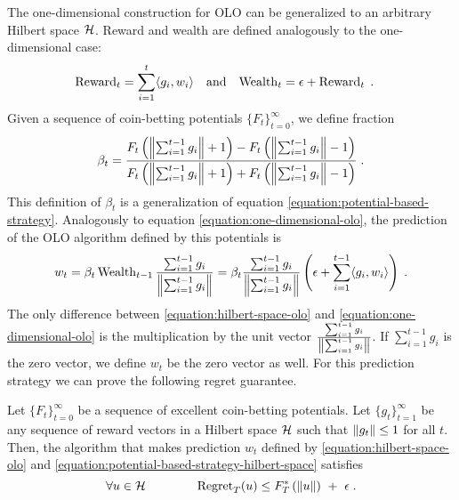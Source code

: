 The one-dimensional construction for OLO can be generalized to an arbitrary
Hilbert space $\mathcal{H}$. Reward and wealth are defined analogously
to the one-dimensional case:
\begin{align*}
\operatorname{Reward}_t &= \sum_{i=1}^t \langle g_i, w_i \rangle &
& \text{and} &
\operatorname{Wealth}_t &= \epsilon + \operatorname{Reward}_t \; .
\end{align*}
Given a sequence of coin-betting potentials $\{F_t\}_{t=0}^\infty$,
we define fraction
\begin{equation}
\label{equation:potential-based-strategy-hilbert-space}
\beta_t = \frac{F_t \left(\left\|{\sum_{i=1}^{t-1} g_i}\right\| + 1\right) - F_t\left(\left\|{\sum_{i=1}^{t-1} g_i}\right\| - 1 \right)}{F_t\left(\left\|{\sum_{i=1}^{t-1} g_i}\right\| + 1 \right) + F_t\left(\left\|{\sum_{i=1}^{t-1} g_i}\right\| - 1 \right)} \; .
\end{equation}
This definition of $\beta_t$ is a generalization of equation
\eqref{equation:potential-based-strategy}.  Analogously to equation
\eqref{equation:one-dimensional-olo}, the prediction of the OLO algorithm
defined by this potentials is
\begin{equation}
\label{equation:hilbert-space-olo}
w_t = \beta_t \operatorname{Wealth}_{t-1} \frac{\sum_{i=1}^{t-1} g_i}{\left\|{\sum_{i=1}^{t-1} g_i}\right\|}
= \beta_t \frac{\sum_{i=1}^{t-1} g_i}{\left\|{\sum_{i=1}^{t-1} g_i}\right\|} \left(\epsilon+ \sum_{i=1}^{t-1} \langle g_i, w_i\rangle \right) \; .
\end{equation}
The only difference between \eqref{equation:hilbert-space-olo} and
\eqref{equation:one-dimensional-olo} is the multiplication by the unit vector
$\frac{\sum_{i=1}^{t-1} g_i}{\left\|{\sum_{i=1}^{t-1} g_i}\right\|}$. If $\sum_{i=1}^{t-1}
g_i$ is the zero vector, we define $w_t$ be the zero vector as well.
For this prediction strategy we can prove the following regret guarantee.
%
\begin{theorem}
\label{theorem:hilbert-space-olo-regret-bound}
Let $\{F_t\}_{t=0}^\infty$ be a sequence of excellent coin-betting potentials.
Let $\{g_t\}_{t=1}^\infty$ be any sequence of reward vectors in a Hilbert space
$\mathcal{H}$ such that $\left\|{g_t}\right\| \le 1$ for all $t$. Then, the algorithm that makes
prediction $w_t$ defined by \eqref{equation:hilbert-space-olo} and
\eqref{equation:potential-based-strategy-hilbert-space} satisfies
$$
\forall u \in \mathcal{H} \qquad \qquad
\operatorname{Regret}_T(u) \le F_T^*\left(\left\|{u}\right\| \right) \ + \ \epsilon \; .
$$
\end{theorem}

